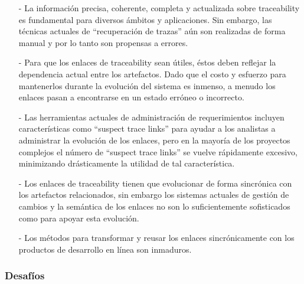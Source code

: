 \documentclass[a4paper,12pt,oneside,spanish]{book}
\begin{document}
\begin{itemize}

\item[-] La información precisa, coherente, completa y actualizada sobre traceability es fundamental para diversos ámbitos y aplicaciones. Sin embargo, las técnicas actuales de “recuperación de trazas” aún son realizadas de forma manual y por lo tanto son propensas a errores.

\item[-] Para que los enlaces de traceability sean útiles, éstos deben reflejar la dependencia actual entre los artefactos. Dado que el costo y esfuerzo para mantenerlos durante la evolución del sistema es inmenso, a menudo los enlaces pasan a encontrarse en un estado erróneo o incorrecto.

 \item[-] Las herramientas actuales de administración de requerimientos incluyen características como “suspect trace links” para ayudar a los analistas a administrar la evolución de los enlaces, pero en la mayoría de los proyectos complejos el número de “suspect trace links” se vuelve rápidamente excesivo, minimizando drásticamente la utilidad de tal característica.
 
\item[-] Los enlaces de traceability tienen que evolucionar de forma sincrónica con los artefactos relacionados, sin embargo los sistemas actuales de gestión de cambios y la semántica de los enlaces no son lo suficientemente sofisticados como para apoyar esta evolución.

\item[-] Los métodos para transformar y reusar los enlaces sincrónicamente con los productos de desarrollo en línea son inmaduros.

\end{itemize}

\subsubsection{Desafíos}
\end{document}
